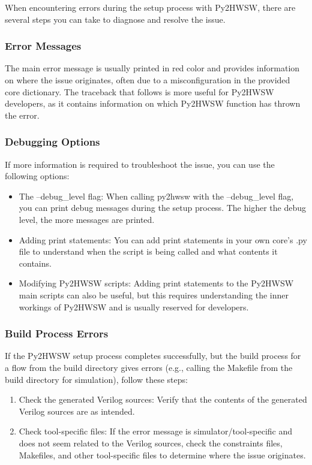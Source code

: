 %

When encountering errors during the setup process with Py2HWSW, there are several steps you can take to diagnose and resolve the issue.

\subsubsection{Error Messages}

The main error message is usually printed in red color and provides information on where the issue originates, often due to a misconfiguration in the provided core dictionary. The traceback that follows is more useful for Py2HWSW developers, as it contains information on which Py2HWSW function has thrown the error.

\subsubsection{Debugging Options}

If more information is required to troubleshoot the issue, you can use the following options:

\begin{itemize}
\item The --debug\_level flag: When calling py2hwsw with the --debug\_level flag, you can print debug messages during the setup process. The higher the debug level, the more messages are printed.
\item Adding print statements: You can add print statements in your own core's .py file to understand when the script is being called and what contents it contains.
\item Modifying Py2HWSW scripts: Adding print statements to the Py2HWSW main scripts can also be useful, but this requires understanding the inner workings of Py2HWSW and is usually reserved for developers.
\end{itemize}

\subsubsection{Build Process Errors}

If the Py2HWSW setup process completes successfully, but the build process for a flow from the build directory gives errors (e.g., calling the Makefile from the build directory for simulation), follow these steps:

\begin{enumerate}
\item Check the generated Verilog sources: Verify that the contents of the generated Verilog sources are as intended.
\item Check tool-specific files: If the error message is simulator/tool-specific and does not seem related to the Verilog sources, check the constraints files, Makefiles, and other tool-specific files to determine where the issue originates.
\end{enumerate}

